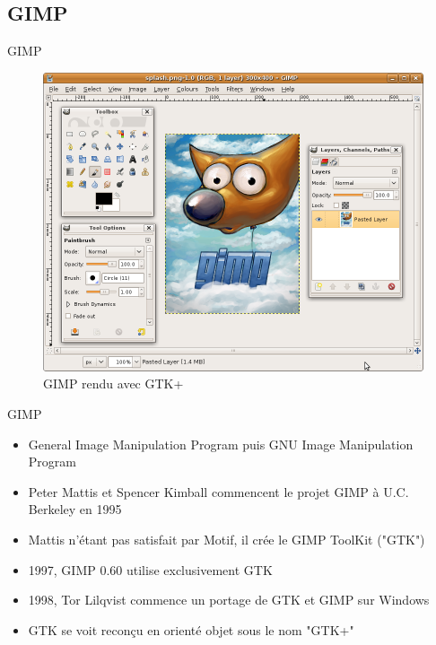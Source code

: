 \documentclass{beamer}
\begin{document}
  \subsection{GIMP}
  \begin{frame}{GIMP}
    \begin{figure}[htb]
    \centering
    \includegraphics[scale=0.225]{"gimp"}
    \caption{GIMP rendu avec GTK+}
    \label{fig:gimpgtk}
    \end{figure}
  \end{frame}
  \begin{frame}{GIMP}
  \begin{itemize}
    \item General Image Manipulation Program puis GNU Image Manipulation Program\\
    \item Peter Mattis et Spencer Kimball commencent le projet GIMP à U.C. Berkeley en 1995\\
    \item Mattis n'étant pas satisfait par Motif, il crée le GIMP ToolKit ("GTK")\\
    \item 1997, GIMP 0.60 utilise exclusivement GTK\\
    \item 1998, Tor Lilqvist commence un portage de GTK et GIMP sur Windows\\
    \item GTK se voit reconçu en orienté objet sous le nom "GTK+"
  \end{itemize}
  \end{frame}
\end{document}
